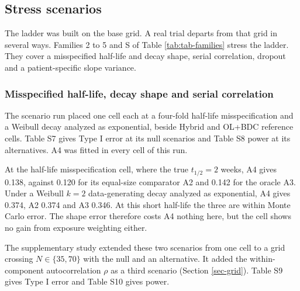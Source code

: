 \documentclass[
  11pt,
]{article}
\begin{document}
\subsection{Stress scenarios}\label{sec-stress}

The ladder was built on the base grid. A real trial departs from
that grid in several ways. Families 2 to 5 and S of Table
\ref{tab:tab-families} stress the ladder. They cover a misspecified
half-life and decay shape, serial correlation, dropout and a
patient-specific slope variance.

\subsubsection{Misspecified half-life, decay shape and serial correlation}\label{sec-scen-grids}

The scenario run placed one cell each at a four-fold half-life
misspecification and a Weibull decay analyzed as exponential, beside
Hybrid and OL+BDC reference cells. Table S7 gives
Type I error at its null scenarios and Table S8
power at its alternatives. A4 was fitted in every cell of this run.

At the half-life misspecification cell, where the true
\(t_{1/2} = 2\) weeks, A4 gives
0.138, against
0.120 for its equal-size comparator A2
and 0.142 for the oracle A3. Under a
Weibull \(k = 2\) data-generating decay analyzed as exponential, A4
gives 0.374, A2
0.374 and A3
0.346. At this short half-life the
three are within Monte Carlo error. The shape error therefore costs
A4 nothing here, but the cell shows no gain from exposure weighting
either.

The supplementary study extended these two scenarios from one cell to
a grid crossing \(N \in \{35, 70\}\) with the null and an alternative. It
added the within-component autocorrelation \(\rho\) as a third scenario
(Section \ref{sec-grid}). Table S9 gives Type
I error and Table S10 gives power.
\end{document}
